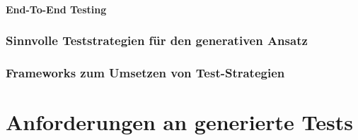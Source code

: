 \documentclass[12pt,a4paper,bibliography=totocnumbered,listof=totocnumbered]{scrartcl}
\begin{document}
\paragraph{End-To-End Testing}

\subsubsection{Sinnvolle Teststrategien für den generativen Ansatz}\label{ch:ms-gen-test}

\subsubsection{Frameworks zum Umsetzen von Test-Strategien}\label{ch:ms-test-frw}

\section{Anforderungen an generierte Tests}\label{ch:anforderungen-tests}
\end{document}
